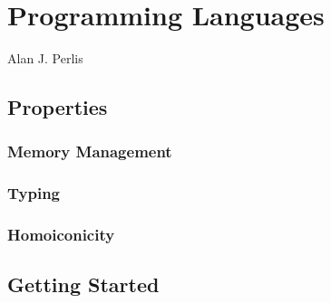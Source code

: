 \chapter{Programming Languages}

\begin{inspiration}{Alan J. Perlis\cite{10.1145/947955.1083808}}
\end{inspiration}


\section{Properties}

\subsection{Memory Management}

\subsection{Typing}

\subsection{Homoiconicity}

\section{Getting Started}

